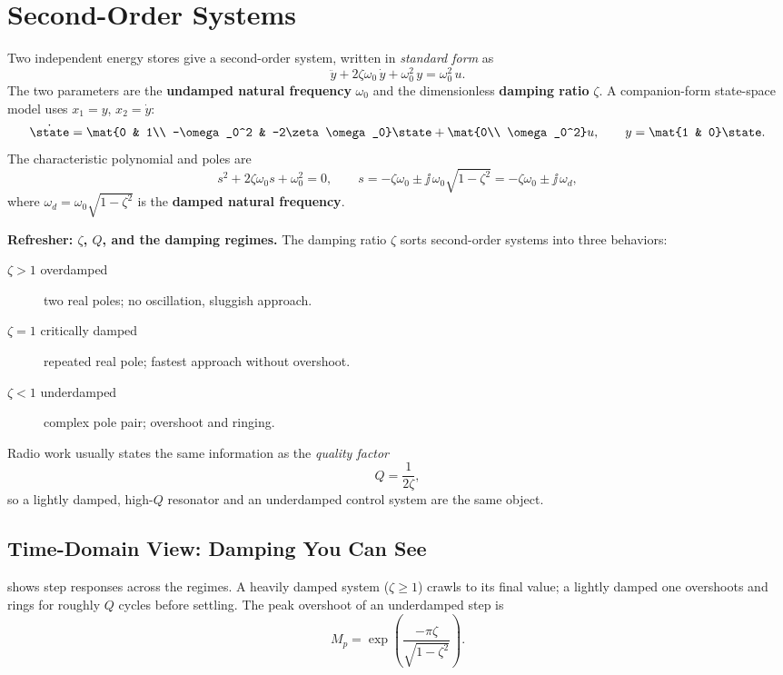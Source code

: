 \section{Second-Order Systems}
Two independent energy stores give a second-order system, written in
\emph{standard form} as
\[
\ddot{y}+2\zeta\omega_0\,\dot{y}+\omega_0^2\,y=\omega_0^2\,u .
\]
The two parameters are the \textbf{undamped natural frequency} \(\omega_0\) and
the dimensionless \textbf{damping ratio} \(\zeta\). A companion-form state-space
model uses \(x_1=y\), \(x_2=\dot{y}\):
\[
\dot{\state}=
\mat{0 & 1\\ -\omega_0^2 & -2\zeta\omega_0}\state
+\mat{0\\ \omega_0^2}u,
\qquad
y=\mat{1 & 0}\state .
\]
The characteristic polynomial and poles are
\[
s^2+2\zeta\omega_0 s+\omega_0^2=0,
\qquad
s=-\zeta\omega_0\pm\jj\,\omega_0\sqrt{1-\zeta^2}
=-\zeta\omega_0\pm\jj\,\omega_d,
\]
where \(\omega_d=\omega_0\sqrt{1-\zeta^2}\) is the \textbf{damped natural
frequency}.

\begin{controlsbox}
\textbf{Refresher: \(\zeta\), \(Q\), and the damping regimes.} The damping ratio
\(\zeta\) sorts second-order systems into three behaviors:
\begin{description}
\item[\(\zeta>1\) overdamped] two real poles; no oscillation, sluggish approach.
\item[\(\zeta=1\) critically damped] repeated real pole; fastest approach without
overshoot.
\item[\(\zeta<1\) underdamped] complex pole pair; overshoot and ringing.
\end{description}
Radio work usually states the same information as the \emph{quality factor}
\[
Q=\frac{1}{2\zeta},
\]
so a lightly damped, high-\(Q\) resonator and an underdamped control system are
the same object.
\end{controlsbox}

\subsection{Time-Domain View: Damping You Can See}
 shows step responses across the regimes. A heavily damped
system (\(\zeta\ge1\)) crawls to its final value; a lightly damped one
overshoots and rings for roughly \(Q\) cycles before settling. The peak
overshoot of an underdamped step is
\[
M_p=\exp\!\left(\frac{-\pi\zeta}{\sqrt{1-\zeta^2}}\right).
\]

